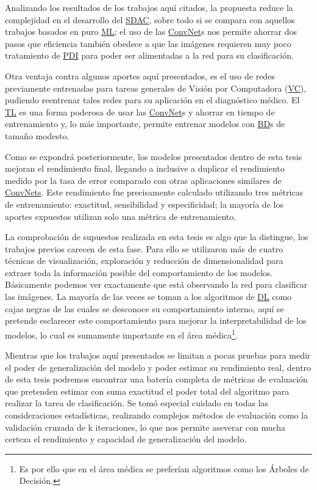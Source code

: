 Analizando los resultados de los trabajos aquí citados, la propuesta reduce la
complejidad en el desarrollo del \hyperlink{abbr}{SDAC}, sobre todo si se
compara con aquellos trabajos basados en puro \hyperlink{abbr}{ML}; el uso de
las \hyperlink{abbr}{ConvNet}s nos permite ahorrar dos pasos que eficiencia
también obedece a que las imágenes requieren muy poco tratamiento de
\hyperlink{abbr}{PDI} para poder ser alimentadas a la red para su clasificación.

Otra ventaja contra algunos aportes aquí presentados, es el uso de redes
previamente entrenadas para tareas generales de Visión por Computadora
(\hyperlink{abbr}{VC}), pudiendo
reentrenar tales redes para su aplicación en el diagnóstico médico. El
\hyperlink{abbr}{TL} es una forma poderosa de usar las
\hyperlink{abbr}{ConvNet}s y ahorrar en tiempo de entrenamiento y, lo más
importante, permite entrenar modelos con \hyperlink{abbr}{BD}s de tamaño modesto.

Como se expondrá posteriormente, los modelos presentados dentro de esta tesis
mejoran el rendimiento final, llegando a inclusive a duplicar el rendimiento
medido por la tasa de error comparado con otras aplicaciones similares de
\hyperlink{abbr}{ConvNets}. Este rendimiento fue precisamente calculado
utilizando tres métricas de entrenamiento: exactitud, sensibilidad y
especificidad; la mayoría de los aportes expuestos utilizan solo una métrica de
entrenamiento.

La comprobación de supuestos realizada en esta tesis es algo que la distingue,
los trabajos previos carecen de esta fase. Para ello se utilizaron más de cuatro
técnicas de visualización, exploración y reducción de dimensionalidad para
extraer toda la información posible del comportamiento de los modelos.
Básicamente podemos ver exactamente que está observando la red para clasificar
las imágenes. La mayoría de las veces se toman a los algoritmos de
\hyperlink{abbr}{DL} como cajas negras de las cuales se desconoce su
comportamiento interno, aquí se pretende esclarecer este comportamiento para
mejorar la interpretabilidad de los modelos, lo cual es sumamente importante en
el área médica\footnote{Es por ello que en el área médica se preferían
algoritmos como los Árboles de Decisión.}.

Mientras que los trabajos aquí presentados se limitan a pocas pruebas para medir
el poder de generalización del modelo y poder estimar su rendimiento real,
dentro de esta tesis podremos encontrar una batería completa de métricas de
evaluación que pretenden estimar con suma exactitud el poder total del algoritmo
para realizar la tarea de clasificación. Se tomó especial cuidado en todas las
consideraciones estadísticas, realizando complejos métodos de evaluación como la
validación cruzada de k iteraciones, lo que nos permite aseverar con mucha
certeza el rendimiento y capacidad de generalización del modelo.

